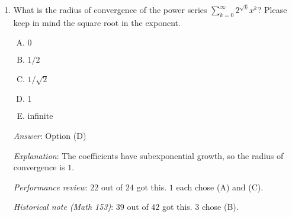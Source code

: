 \documentclass[10pt]{amsart}
\begin{document}
\begin{enumerate}
  {\em Answer}: Option (D)

  {\em Explanation}: For the boundary points, we use the alternating
  series theorem. See a more detailed discussion in the lecture notes.

  {\em Performance review}: $19$ out of $24$ got this. $3$ chose (A),
  $2$ chose (E).

  {\em Historical note (Math 153)}: $40$ out of $42$ got this. $1$ each chose
  (A) and (E).

  {\em Historical note (last year)}: $10$ out of $11$ got this
  correct. $1$ chose (A).

  {\em Historical note (two years ago)}: $11$ out of $26$ people got this
  correct. $8$ chose (A), $4$ chose (C), $2$ chose (B), $1$ chose (E).

\item What is the radius of convergence of the power series
  $\sum_{k=0}^\infty 2^{\sqrt{k}} x^k$? Please keep in mind the square
  root in the exponent.

  \begin{enumerate}[(A)]
  \item $0$
  \item $1/2$
  \item $1/\sqrt{2}$
  \item $1$
  \item infinite
  \end{enumerate}

  {\em Answer}: Option (D)

  {\em Explanation}: The coefficients have subexponential growth, so
  the radius of convergence is $1$.

  {\em Performance review}: $22$ out of $24$ got this. $1$ each chose
  (A) and (C).

  {\em Historical note (Math 153)}: $39$ out of $42$ got this. $3$
  chose (B).

\end{enumerate}
\end{document}
